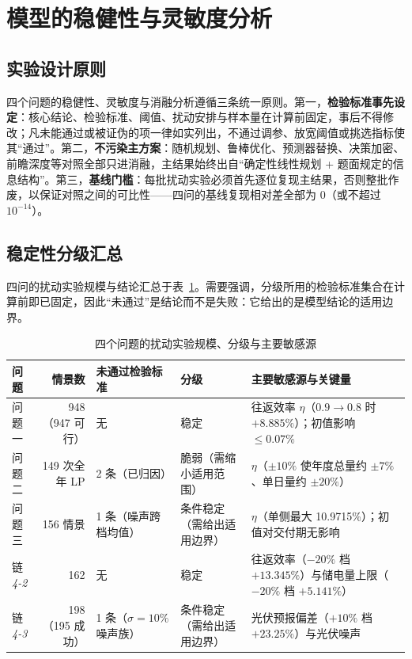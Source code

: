 \section{模型的稳健性与灵敏度分析}

\subsection{实验设计原则}

四个问题的稳健性、灵敏度与消融分析遵循三条统一原则。第一，\textbf{检验标准事先设定}：核心结论、检验标准、阈值、扰动安排与样本量在计算前固定，事后不得修改；凡未能通过或被证伪的项一律如实列出，不通过调参、放宽阈值或挑选指标使其“通过”。第二，\textbf{不污染主方案}：随机规划、鲁棒优化、预测器替换、决策加密、前瞻深度等对照全部只进消融，主结果始终出自“确定性线性规划 + 题面规定的信息结构”。第三，\textbf{基线门槛}：每批扰动实验必须首先逐位复现主结果，否则整批作废，以保证对照之间的可比性——四问的基线复现相对差全部为 0（或不超过 $10^{-14}$）。

\subsection{稳定性分级汇总}

四问的扰动实验规模与结论汇总于表~\ref{tab:rob}。需要强调，分级所用的检验标准集合在计算前即已固定，因此“未通过”是结论而不是失败：它给出的是模型结论的适用边界。

\begin{table}[htbp]
\centering
\footnotesize
\caption{四个问题的扰动实验规模、分级与主要敏感源}
\label{tab:rob}
\begin{tabular}{p{1.5cm}rp{3.0cm}p{2.2cm}p{4.9cm}}
\toprule
问题 & 情景数 & 未通过检验标准 & 分级 & 主要敏感源与关键量 \\
\midrule
问题一 & 948（947 可行） & 无 & 稳定 & 往返效率 $\eta$（$0.9\to0.8$ 时 $+8.885\%$）；初值影响 $\le0.07\%$ \\
问题二 & 149 次全年 LP & 2 条（已归因） & 脆弱（需缩小适用范围） & $\eta$（$\pm10\%$ 使年度总量约 $\pm7\%$、单日量约 $\pm20\%$） \\
问题三 & 156 情景 & 1 条（噪声跨档均值） & 条件稳定（需给出适用边界） & $\eta$（单侧最大 10.9715\%）；初值对交付期无影响 \\
链 \emph{4-2} & 162 & 无 & 稳定 & 往返效率（$-20\%$ 档 $+13.345\%$）与储电量上限（$-20\%$ 档 $+5.141\%$） \\
链 \emph{4-3} & 198（195 成功） & 1 条（$\sigma=10\%$ 噪声族） & 条件稳定（需给出适用边界） & 光伏预报偏差（$+10\%$ 档 $+23.25\%$）与光伏噪声 \\
\bottomrule
\end{tabular}
\end{table}

